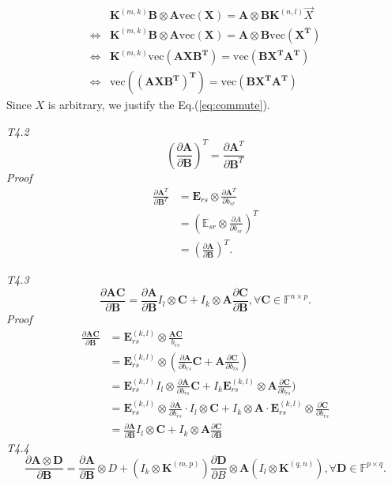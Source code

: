 \documentclass[a4paper,11pt]{article}
\def\E{\mathbb{E}}
\def\m#1{\mathbf{#1}}
\def\v#1{\mathrm{vec}({\mathbf{#1}})}
\def\F{\mathbb{F}}
\begin{document}
\begin{align}
    & \m K^{(m,k)}\m B \otimes \m A \v{X}= \m A \otimes \m B \m K^{(n,l)}\vec{X} \\
    \Leftrightarrow & \m K^{(m,k)}\m B \otimes \m A \v{X} = \m A \otimes \m B \v{X^T} \\
    \Leftrightarrow & \m K^{(m,k)} \v{A X B^T} = \v{B X^T A^T} \\ 
    \Leftrightarrow & \v{(AXB^T)^T} = \v{B X^T A^T}
\end{align}
Since $X$ is arbitrary, we justify the Eq.(\ref{eq:commute}). \\
{}

\emph{T4.2}
\begin{equation}
    (\frac{\partial \m A}{\partial \m B})^T = \frac{\partial \m A^T}{\partial \m B^T}
\end{equation}
\emph{Proof}
\begin{align}
    \frac{\partial \m A^T}{\partial \m B^T} & =  \m E_{rs} \otimes \frac{\partial \m A^T}{\partial b_{sr}} \\ & = \left(\E_{sr} \otimes \frac{\partial A}{\partial b_{sr}}\right)^T \\ & = (\frac{\partial \m A}{\partial \m B})^T.
\end{align}

\emph{T4.3}
\begin{equation}
    \frac{\partial \m A \m C}{\partial \m B} = \frac{\partial \m A}{\partial \m B} I_l \otimes \m C + I_{k}\otimes \m A \frac{\partial \m C}{\partial \m B}, \forall \m C \in \F^{n\times p}.
\end{equation}
\emph{Proof}
\begin{align}
    \frac{\partial \m A \m C}{\partial \m B} & = \m E^{(k,l)}_{rs} \otimes \frac{\m A \m C}{b_{rs}} \\ & = \m E^{(k,l)}_{rs} \otimes (\frac{\partial \m A}{\partial b_{rs}} \m C + \m A \frac{\partial \m C}{\partial b_{rs}}) \\ & = \m E^{(k,l)}_{rs} I_l \otimes \frac{\partial \m A}{\partial b_{rs}} \m C + I_k \m E^{(k,l)}_{rs} \otimes \m A \frac{\partial \m C}{\partial b_{rs}}) \\ & = \m E^{(k,l)}_{rs} \otimes \frac{\partial \m A}{\partial b_{rs}}\cdot I_l \otimes \m C + I_k \otimes \m A \cdot \m E^{(k,l)}_{rs} \otimes \frac{\partial \m C}{\partial b_{rs}} \\ & = \frac{\partial \m A}{\partial \m B} I_l \otimes \m C + I_{k}\otimes \m A \frac{\partial \m C}{\partial \m B}
\end{align}
\emph{T4.4}
\begin{equation}
    \frac{\partial \m A \otimes \m D}{\partial \m B} = \frac{\partial \m A}{\partial \m B} \otimes D +  (I_k \otimes \m K^{(m,p)})\frac{\partial \m D}{\partial B} \otimes \m A (I_l \otimes \m K^{(q, n)}) , \forall \m D \in \F^{p\times q}.
\end{equation}
\end{document}
